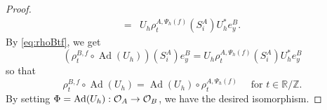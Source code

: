 \documentclass[11pt]{article}
\newtheorem{corollary}[theorem]{Corollary}
\theoremstyle{plain}
\theoremstyle{definition}
\numberwithin{equation}{section}
\renewcommand{\labelenumi}{\textup{(\theenumi)}}
\newcommand{\Ad}{\operatorname{Ad}}
\newcommand{\RZ}{\mathbb{R}/{\mathbb{Z}}}
\newcommand{\Z}{\mathbb{Z}}
\begin{document}
\begin{proof}
\begin{align*}
= & U_h \rho_t^{A,\Psi_h(f)}(S_i^A ) U_h^* e_y^B. 
\end{align*}
By \eqref{eq:rhoBtf}, we get
\begin{equation*}
(\rho^{B,f}_t \circ \Ad(U_h)) (S_i^A) e_y^B
=  U_h \rho_t^{A,\Psi_h(f)}(S_i^A ) U_h^* e_y^B 
\end{equation*}
so that 
\begin{equation*}
\rho^{B,f}_t \circ \Ad(U_h)  
=\Ad(U_h) \circ  \rho_t^{A,\Psi_h(f)}
\quad \text{ for } t \in \RZ.
\end{equation*}
By setting 
$\Phi = \Ad(U_h): \OA\rightarrow \OB$,
we have the desired isomorphism.
\end{proof}
\end{document}
